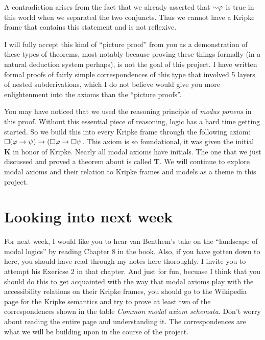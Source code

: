 A contradiction arises from the fact that we already asserted that $\mathord{\sim} \varphi$ is true in this world
when we separated the two conjuncts. Thus we cannot have a Kripke frame that contains this statement and is not reflexive.

\begin{center}
    
\end{center}

I will fully accept this kind of ``picture proof''
from you as a demonstration of these types of theorems, most notably because proving these things formally (in a natural
deduction system perhaps), is not the goal of this project. I have written formal proofs of fairly simple correspondences of 
this type that involved 5 layers of nested subderivations, which I do not believe would give you more enlightenment into 
the axioms than the ``picture proofs''.

You may have noticed that we used the reasoning principle of \emph{modus ponens} in this proof. Without this essential piece
of reasoning, logic has a hard time getting started. So we build this into every Kripke frame through the following axiom:
$\square(\varphi \rightarrow \psi) \rightarrow (\square \varphi \rightarrow \square \psi$. This axiom is so foundational,
it was given the initial \textbf{K} in honor of Kripke. Nearly all modal axioms have initials. The one that we just discussed
and proved a theorem about is called \textbf{T}. We will continue to explore modal axioms and their relation to Kripke frames
and models as a theme in this project.

\section{Looking into next week}
For next week, I would like you to hear van Benthem's take on the ``landscape of modal logics'' by reading Chapter 8 in 
the book. Also, if you have gotten down to here, you should have read through my notes here thoroughly. I invite you to 
attempt his Exericse 2 in that chapter. And just for fun, becuase I think that you should do this to get acquainted with 
the way that modal axioms play with the accessibility relations on their Kripke frames, you should go to the Wikipedia
page for the Kripke semantics and try to prove at least two of the correspondences shown in the table \emph{Common
modal axiom schemata}. Don't worry about reading the entire page and understanding it. The correspondences are what we will
be building upon in the course of the project.
